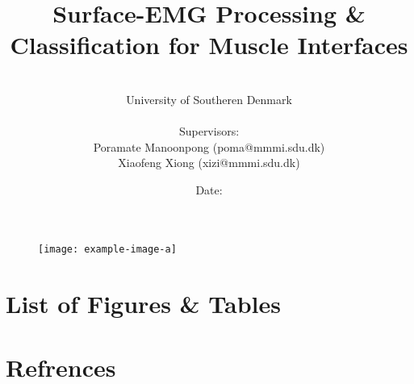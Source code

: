 \documentclass[a4paper, 12pt]{article}
\title{Surface-EMG Processing \& Classification for Muscle Interfaces}
\author{
\\University of Southeren Denmark
\\
\\Supervisors: 
\\Poramate Manoonpong (poma@mmmi.sdu.dk)
\\Xiaofeng Xiong (xizi@mmmi.sdu.dk)
}
\date{Date: }
\begin{document}
\maketitle
\begin{figure}[h]
\begin{center}
\texttt{[image: example-image-a]}
\end{center}
\end{figure}
\newpage


\newpage


\newpage


\newpage

\tableofcontents
\newpage


\newpage

\newpage

\newpage

\newpage

\newpage

\newpage

\newpage

\section{List of Figures \& Tables}
\listoffigures
\listoftables
\newpage

\section{Refrences}
\printbibliography
\end{document}
